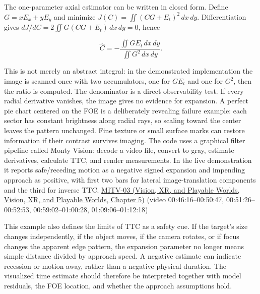 The one-parameter axial estimator can be written in closed form. Define \(G=xE_x+yE_y\) and minimize \(J(C)=\iint (CG+E_t)^2\,dx\,dy\). Differentiation gives \(dJ/dC=2\iint G(CG+E_t)\,dx\,dy=0\), hence

\[
\widehat C=-\frac{\iint GE_t\,dx\,dy}{\iint G^2\,dx\,dy}.
\]

This is not merely an abstract integral: in the demonstrated implementation the image is scanned once with two accumulators, one for \(GE_t\) and one for \(G^2\), then the ratio is computed. The denominator is a direct observability test. If every radial derivative vanishes, the image gives no evidence for expansion. A perfect pie chart centered on the FOE is a deliberately revealing failure example: each sector has constant brightness along radial rays, so scaling toward the center leaves the pattern unchanged. Fine texture or small surface marks can restore information if their contrast survives imaging. The code uses a graphical filter pipeline called Monty Vision: decode a video file, convert to gray, estimate derivatives, calculate TTC, and render measurements. In the live demonstration it reports safe/receding motion as a negative signed expansion and impending approach as positive, with first two bars for lateral image-translation components and the third for inverse TTC. \href{../07-Vision-XR-and-Playable-Worlds/main.pdf\#nameddest=04-visual-computing-ii-ch036-mitv-03---time-to-contact-focus-of-expansion-direct-motion-vision-methods-noise-gain}{MITV-03 (Vision, XR, and Playable Worlds, Vision, XR, and Playable Worlds, Chapter 5)} (video 00:46:16--00:50:47, 00:51:26--00:52:53, 00:59:02--01:00:28, 01:09:06--01:12:18)

This example also defines the limits of TTC as a safety cue. If the target's size changes independently, if the object moves, if the camera rotates, or if focus changes the apparent edge pattern, the expansion parameter no longer means simple distance divided by approach speed. A negative estimate can indicate recession or motion away, rather than a negative physical duration. The visualized time estimate should therefore be interpreted together with model residuals, the FOE location, and whether the approach assumptions hold.

